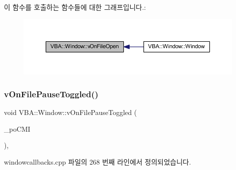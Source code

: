 이 함수를 호출하는 함수들에 대한 그래프입니다.\+:
\nopagebreak
\begin{figure}[H]
\begin{center}
\leavevmode
\includegraphics[width=350pt]{class_v_b_a_1_1_window_a8495a133642f2f0428d9487c86c8a231_icgraph}
\end{center}
\end{figure}
\mbox{\label{class_v_b_a_1_1_window_a8cfc0cc364908602c3881304be30dfe4}} 
\subsubsection{\texorpdfstring{v\+On\+File\+Pause\+Toggled()}{vOnFilePauseToggled()}}
{\footnotesize\ttfamily void V\+B\+A\+::\+Window\+::v\+On\+File\+Pause\+Toggled (\begin{DoxyParamCaption}\item[{Gtk\+::\+Check\+Menu\+Item $\ast$}]{\+\_\+po\+C\+MI }\end{DoxyParamCaption})\hspace{0.3cm}{\ttfamily [protected]}, {\ttfamily [virtual]}}



windowcallbacks.\+cpp 파일의 268 번째 라인에서 정의되었습니다.


